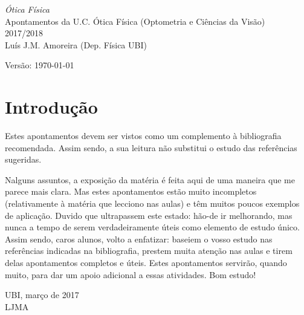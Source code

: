 \begin{titlepage}
\noindent
{\Huge\sffamily\textsl{Ótica Física}}\\[10mm]
{\Large\textsf{Apontamentos da U.C. Ótica Física
(Optometria e Ciências da Visão)}}\\[5mm]
{\Large\textsf 2017/2018}\\[15mm]
{\large\textsf{Luís J.M. Amoreira (Dep. Física UBI)}}

\vspace{35mm}
\noindent
{\small \textsf{Versão: \today}}
\vfill
\begin{center}
\end{center}
\vfill
\end{titlepage}
\thispagestyle{plain}
\section*{Introdução}
Estes apontamentos devem ser vistos como um complemento à bibliografia
recomendada. Assim sendo, a sua leitura não substitui o estudo das 
referências sugeridas.

\noindent
Nalguns assuntos, a exposição da matéria é feita aqui de uma maneira que me
parece mais clara. Mas estes apontamentos estão muito incompletos (relativamente
à matéria que lecciono nas aulas) e têm muitos poucos exemplos de aplicação.
Duvido que ultrapassem este estado: hão-de ir melhorando, mas nunca a tempo de
serem verdadeiramente úteis como elemento de estudo único. Assim sendo, caros
alunos, volto a enfatizar: baseiem o vosso estudo nas referências indicadas na
bibliografia, prestem muita atenção nas aulas e tirem delas apontamentos
completos e úteis. Estes apontamentos servirão, quando muito, para dar um apoio
adicional a essas atividades. 
\noindent
Bom estudo!

\vspace{2cm}
\hfill
\begin{minipage}{0.4\linewidth}
UBI, março de 2017\\
LJMA
\end{minipage}

\vspace{3cm}

